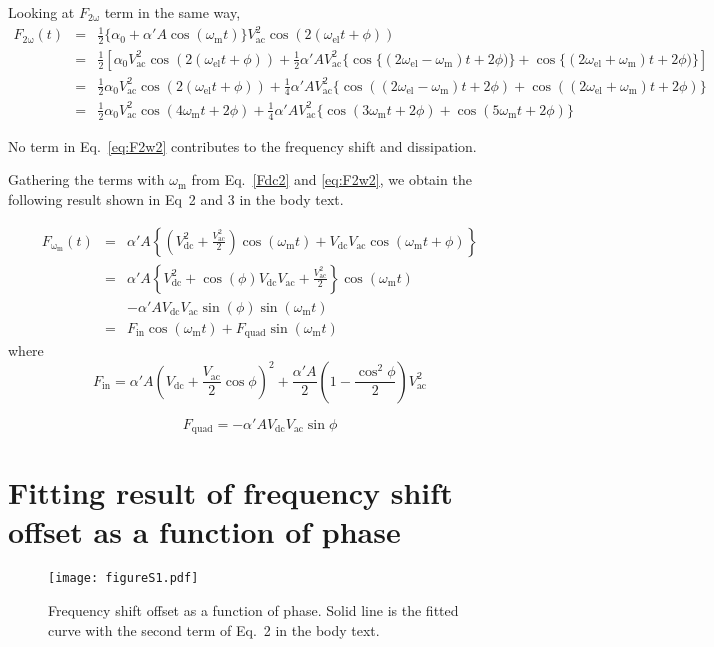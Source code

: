 \documentclass[preprint]{revtex4-1}
\newcommand{\Vdc}{V_\mathrm{dc}}
\newcommand{\Vac}{V_\mathrm{ac}}
\newcommand{\Fww}{F_\mathrm{2\omega}}
\newcommand{\Fin}{F_\mathrm{in}}
\newcommand{\Fout}{F_\mathrm{quad}}
\newcommand{\wm}{\omega_\mathrm{m}}
\newcommand{\Fwm}{F_\mathrm{\wm}}
\newcommand{\wel}{\omega_\mathrm{el}}
\begin{document}
Looking at $\Fww$ term in the same way,
\begin{eqnarray}
       \Fww(t) &=& \frac{1}{2} \{\alpha_0 +  \alpha' A \cos(\wm t)\} \Vac ^2 \cos (2(\wel t + \phi)) \nonumber \\ 
       & = & \frac{1}{2}  [\alpha_0 \Vac ^2 \cos (2(\wel t + \phi)) 
       + \frac{1}{2} \alpha' A \Vac ^2 \{ \cos \{(2\wel - \wm)t + 2\phi)\} 
       +  \cos \{(2\wel + \wm) t + 2\phi)\}]  \nonumber \\
       & = & \frac{1}{2}  \alpha_0 \Vac ^2 \cos (2(\wel t + \phi)) 
       + \frac{1}{4} \alpha' A \Vac ^2 \{ \cos ((2\wel - \wm)t + 2\phi)
       +  \cos ((2\wel + \wm) t + 2\phi)\} \nonumber \\
       & = & \frac{1}{2}  \alpha_0 \Vac ^2 \cos (4\wm t + 2\phi) 
       + \frac{1}{4} \alpha' A \Vac ^2 \{ \cos (3\wm t + 2\phi)
       +  \cos (5\wm t + 2\phi)\}   \label{eq:F2w2}
\end{eqnarray}

 No term in Eq.~\ref{eq:F2w2} contributes to the frequency shift and dissipation.

 Gathering the terms with $\wm$ from Eq.~\ref{Fdc2} and \ref{eq:F2w2}, 
we obtain the following result shown in Eq~2 and 3 in the body text.

 \begin{eqnarray*}
  \Fwm(t) & = &   \alpha' A \left\{ \left(\Vdc ^2 + \frac{\Vac^2}{2}\right) \cos (\wm t)
      +  \Vdc \Vac  \cos (\wm t + \phi)\right\}\\
       & = & \alpha' A \left\{\Vdc ^2 +  \cos(\phi) \Vdc\Vac +\frac{\Vac^2}{2} \right\}\cos(\wm t) \\ 
  & &    -\alpha' A \Vdc \Vac  \sin(\phi) \sin(\wm t)\\
    & = & \Fin \cos (\wm t) + \Fout \sin(\wm t)
\end{eqnarray*}
where
\begin{equation}
  \Fin =  \alpha'A \left(\Vdc + \frac{\Vac}{2} \cos\phi   \right)^2
  + \frac{\alpha'A }{2}\left(1 - \frac{\cos^2\phi}{2} \right) \Vac^2
  \label{eq:Fin}
\end{equation}

\begin{equation}
  \Fout = - \alpha'A  \Vdc\Vac  \sin\phi 
    \label{eq:Fquad}
\end{equation}


\section{Fitting result of frequency shift offset as a function of phase}
\begin{figure}[h]
  \centering
  \texttt{[image: figureS1.pdf]}
  \caption{Frequency shift offset as a function of phase. 
    Solid line is the fitted curve with the second term of Eq.~2 in the body text.
\label{fig:DKPFM_image}}
\end{figure}
\end{document}
